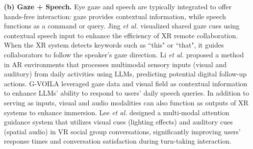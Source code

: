 \documentclass[review]{fcs}
\newcommand{\revise}[2]{\textcolor[rgb]{0,0,0}{#2}}
\newcommand{\ccite}{\textcolor[rgb]{0,0,1}{[cite]}}
\begin{document}

\textbf{(b) Gaze + Speech.} Eye gaze and speech are typically integrated to offer hands-free interaction: gaze provides contextual information, while speech functions as a command or query.
\revise{Jing \textit{et al.} visualized shared gaze cues using contextual speech input to enhance the efficiency of XR remote collaboration \cite{DBLP:conf/vr/JingLB22}.}{Jing \textit{et al.} \cite{DBLP:conf/vr/JingLB22} visualized shared gaze cues using contextual speech input to enhance the efficiency of XR remote collaboration.} When the XR system detects keywords such as ``this" or ``that", it guides collaborators to follow the speaker's gaze direction.
\revise{Li \textit{et al.} proposed a method in AR environments that processes multimodal sensory inputs (visual and auditory) from daily activities using LLMs, predicting potential digital follow-up actions \cite{10.1145/3613904.3642068}.}{Li \textit{et al.} \cite{10.1145/3613904.3642068} proposed a method in AR environments that processes multimodal sensory inputs (visual and auditory) from daily activities using LLMs, predicting potential digital follow-up actions.} 
\revise{G-VOILA leveraged gaze data and visual field as contextual information to enhance LLMs' ability to respond to users' daily speech queries \cite{DBLP:journals/imwut/WangSWYYWJXY24}.}{G-VOILA \cite{DBLP:journals/imwut/WangSWYYWJXY24} leveraged gaze data and visual field as contextual information to enhance LLMs' ability to respond to users' daily speech queries.} In addition to serving as inputs, visual and audio modalities can also function as outputs of XR systems to enhance immersion.
\revise{Lee \textit{et al.} designed a multi-modal attention guidance system that utilizes visual cues (lighting effects) and auditory cues (spatial audio) in social VR group conversations, significantly improving users' response times and conversation satisfaction during turn-taking interactions \cite{10462901}.}{Lee \textit{et al.} \cite{10462901} designed a multi-modal attention guidance system that utilizes visual cues (lighting effects) and auditory cues (spatial audio) in VR social group conversations, significantly improving users' response times and conversation satisfaction during turn-taking interaction.}
\end{document}
